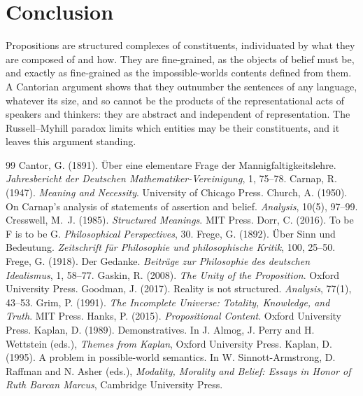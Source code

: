 \documentclass{situationist-preprint}
\begin{document}
\section{Conclusion}

Propositions are structured complexes of constituents, individuated by what they are composed of and how. They are fine-grained, as the objects of belief must be, and exactly as fine-grained as the impossible-worlds contents defined from them. A Cantorian argument shows that they outnumber the sentences of any language, whatever its size, and so cannot be the products of the representational acts of speakers and thinkers: they are abstract and independent of representation. The Russell--Myhill paradox limits which entities may be their constituents, and it leaves this argument standing.

\begin{thebibliography}{99}\small
{} Cantor, G. (1891). \"Uber eine elementare Frage der Mannigfaltigkeitslehre. \emph{Jahresbericht der Deutschen Mathematiker-Vereinigung}, 1, 75--78.
 Carnap, R. (1947). \emph{Meaning and Necessity}. University of Chicago Press.
 Church, A. (1950). On Carnap's analysis of statements of assertion and belief. \emph{Analysis}, 10(5), 97--99.
 Cresswell, M.~J. (1985). \emph{Structured Meanings}. MIT Press.
 Dorr, C. (2016). To be F is to be G. \emph{Philosophical Perspectives}, 30.
 Frege, G. (1892). \"Uber Sinn und Bedeutung. \emph{Zeitschrift f\"ur Philosophie und philosophische Kritik}, 100, 25--50.
 Frege, G. (1918). Der Gedanke. \emph{Beitr\"age zur Philosophie des deutschen Idealismus}, 1, 58--77.
 Gaskin, R. (2008). \emph{The Unity of the Proposition}. Oxford University Press.
 Goodman, J. (2017). Reality is not structured. \emph{Analysis}, 77(1), 43--53.
 Grim, P. (1991). \emph{The Incomplete Universe: Totality, Knowledge, and Truth}. MIT Press.
 Hanks, P. (2015). \emph{Propositional Content}. Oxford University Press.
 Kaplan, D. (1989). Demonstratives. In J. Almog, J. Perry and H. Wettstein (eds.), \emph{Themes from Kaplan}, Oxford University Press.
 Kaplan, D. (1995). A problem in possible-world semantics. In W. Sinnott-Armstrong, D. Raffman and N. Asher (eds.), \emph{Modality, Morality and Belief: Essays in Honor of Ruth Barcan Marcus}, Cambridge University Press.

\end{thebibliography}
\end{document}
